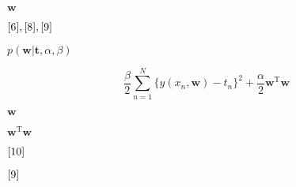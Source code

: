 \documentclass[10pt]{book}
\begin{document}
\begin{mdSnippets}
\begin{mdInlineSnippet}[e8d1025023b4b2aa1dda755aa92e085d]
$\textbf{w}$\end{mdInlineSnippet}%
\begin{mdInlineSnippet}[2b0b64aa1456cc8cdfe18f71c8426856]%
$\eqref{6},\eqref{8},\eqref{9}$\end{mdInlineSnippet}%
\begin{mdInlineSnippet}%
$p(\textbf{w}|\textbf{t},\alpha,\beta) $\end{mdInlineSnippet}%
\begin{mdDisplaySnippet}[2e69a535771c33a28be5c2f8185aa0b1]%
\[%
\frac{\beta}{2}\sum_{n=1}^{N}\{y(x_n,\textbf{w})-t_n\}^2+\frac{\alpha}{2}\textbf{w}^\mathrm{T}\textbf{w}\tag{12}
\]%
\end{mdDisplaySnippet}%
\begin{mdInlineSnippet}[e8d1025023b4b2aa1dda755aa92e085d]%
$\textbf{w}$\end{mdInlineSnippet}%
\begin{mdInlineSnippet}[e55ff9ad7e9f875a357df0f62ee24c93]%
$\textbf{w}^\mathrm{T}\textbf{w}$\end{mdInlineSnippet}%
\begin{mdInlineSnippet}[d8ae609f8021e7d49190cca77514ca6b]%
$\eqref{10}$\end{mdInlineSnippet}%
\begin{mdInlineSnippet}[04f8b6840ea905980ba660c745054547]%
$\eqref{9}$\end{mdInlineSnippet}%

\end{mdSnippets}
\end{document}
